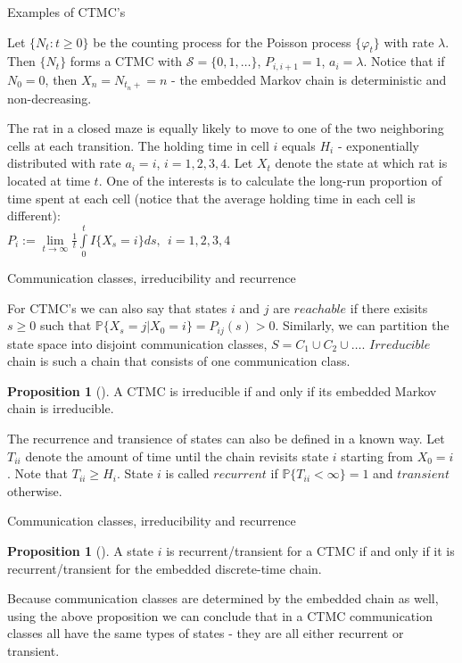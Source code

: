 \documentclass{beamer}%
\theoremstyle{definition}
\newtheorem{proposition}[theorem]{Proposition}
\renewcommand{\P}{\mathbb{P}}
\begin{document}
\begin{frame}{Examples of CTMC's}

\begin{example}
Let $\{N_t: t\geqslant0\}$ be the counting process for the Poisson process $\{\varphi_t\}$ with rate $\lambda$. Then $\{N_t\}$ forms a CTMC with $\mathcal{S}=\{0, 1,\dotsc\}$, $P_{i, i+1}=1$, $a_i=\lambda$. Notice that if $N_0=0$, then $X_n=N_{t_n+}=n$ - the embedded Markov chain is deterministic and non-decreasing.
\end{example}
\begin{example}
The rat in a closed maze is equally likely to move to one of the two neighboring cells at each transition. The holding time in cell $i$ equals $H_i$ - exponentially distributed with rate $a_i=i$, $i=1, 2, 3, 4$. Let $X_t$ denote the state at which rat is located at time $t$. One of the interests is to calculate the long-run proportion of time spent at each cell (notice that the average holding time in each cell is different):
\\
$P_i:=\lim\limits_{t\to\infty}\frac{1}{t}\int\limits_{0}^tI\{X_s=i\}ds, \:\: i=1, 2, 3, 4$
\end{example}

\end{frame}


\begin{frame}{Communication classes, irreducibility and recurrence}

For CTMC's we can also say that states $i$ and $j$ are $reachable$ if there exisits $s\geqslant0$ such that $\P\{X_s=j|X_0=i\}=P_{ij}(s)>0$. Similarly, we can partition the state space into disjoint communication classes, $S=C_1\cup C_2\cup\dotsc$. $Irreducible$ chain is such a chain that consists of one communication class.
\begin{proposition}[]
A CTMC is irreducible if and only if its embedded Markov chain is irreducible.
\end{proposition}
The recurrence and transience of states can also be defined in a known way. Let $T_{ii}$ denote the amount of time until the chain revisits state $i$ starting from $X_0=i$. Note that $T_{ii}\geqslant H_i$. State $i$ is called $recurrent$ if $\P\{T_{ii}<\infty\}=1$ and $transient$ otherwise.

\end{frame}


\begin{frame}{Communication classes, irreducibility and recurrence}

\begin{proposition}[]
A state $i$ is recurrent/transient for a CTMC if and only if it is recurrent/transient for the embedded discrete-time chain.
\end{proposition}
Because communication classes are determined by the embedded chain as well, using the above proposition we can conclude that in a CTMC communication classes all have the same types of states - they are all either recurrent or transient.

\end{frame}
\end{document}
